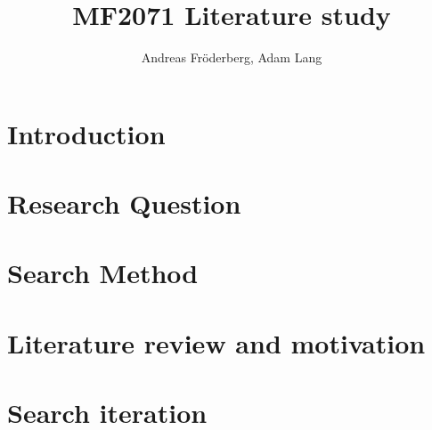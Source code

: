 \documentclass[a4paper, 12pt]{article}
\title{MF2071 Literature study}
\author{Andreas Fr\"{o}derberg, Adam Lang}
\begin{document}
\maketitle
\pagebreak
\section*{Introduction}


\section*{Research Question}


\section*{Search Method}


\section*{Literature review and motivation}


\pagebreak
\section*{Search iteration}


\pagebreak


\end{document}
